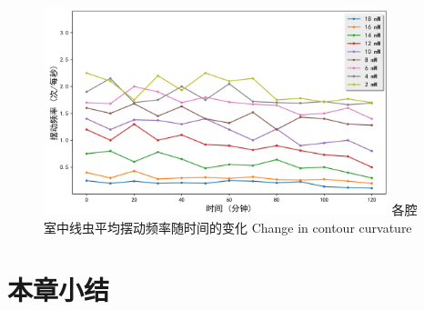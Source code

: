 	\begin{figure}[h]
	  \centering
	  \includegraphics[width=10cm]{figure/chap5/res.jpg}
	  \bicaption
		{各腔室中线虫平均摆动频率随时间的变化}
		{Change in contour curvature}
	  \label{fig:res}
	\end{figure}
\section{本章小结}